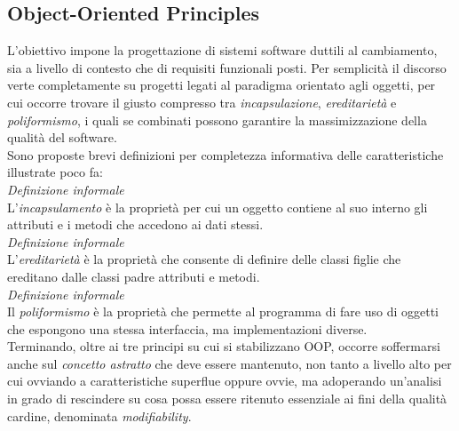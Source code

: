 \documentclass{article}
\begin{document}
\subsection*{Object-Oriented Principles}
\large
L'obiettivo impone la progettazione di sistemi software duttili al cambiamento, sia a livello di contesto che di requisiti funzionali posti. Per semplicità il discorso verte completamente su progetti legati al paradigma orientato agli oggetti, per cui occorre trovare il giusto compresso tra \textit{incapsulazione}, \textit{ereditarietà} e \textit{poliformismo}, i quali se combinati possono garantire la massimizzazione della qualità del software.\vspace*{14pt}\\
Sono proposte brevi definizioni per completezza informativa delle caratteristiche illustrate poco fa:\vspace*{14pt}\\
\textit{Definizione informale}\\
L'\textit{incapsulamento} è la proprietà per cui un oggetto contiene al suo interno gli attributi e i metodi che accedono ai dati stessi.\vspace*{14pt}\\
\textit{Definizione informale}\\
L'\textit{ereditarietà} è la proprietà che consente di definire delle classi figlie che ereditano dalle classi padre attributi e metodi.\vspace*{14pt}\\
\textit{Definizione informale}\\
Il \textit{poliformismo} è la proprietà che permette al programma di fare uso di oggetti che espongono una stessa interfaccia, ma implementazioni diverse.\vspace*{14pt}\\
Terminando, oltre ai tre principi su cui si stabilizzano OOP, occorre soffermarsi anche sul \textit{concetto astratto} che deve essere mantenuto, non tanto a livello alto per cui ovviando a caratteristiche superflue oppure ovvie, ma adoperando un'analisi in grado di rescindere su cosa possa essere ritenuto essenziale ai fini della qualità cardine, denominata \textit{modifiability}.
\end{document}
